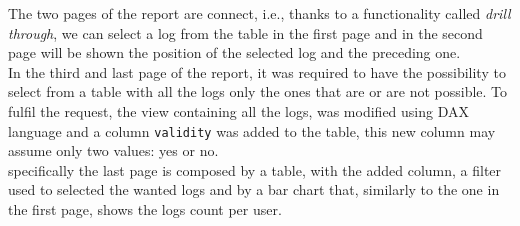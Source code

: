 \documentclass[12pt, a4paper, oneside]{article}
\begin{document}
The two pages of the report are connect, i.e., thanks to a functionality called \emph{drill through}, we can select a log from the table in the first page and in the second page will be shown the position
of the selected log and the preceding one.\\
In the third and last page of the report, it was required to have the possibility to select from a table with all the logs only the ones that are or are not possible. To fulfil the request, the view containing
all the logs, was modified using DAX language and a column \texttt{validity} was added to the table, this new column may assume only two values: yes or no.\\
specifically the last page is composed by a table, with the added column, a filter used to selected the wanted logs and by a bar chart that, similarly to the one in the first page, shows the logs count per user.

\newpage
\end{document}
